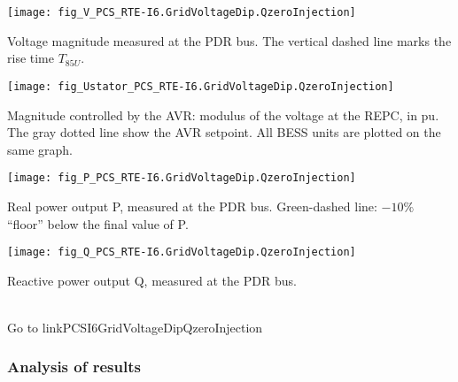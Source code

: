     \noindent
    \begin{minipage}[t]{0.48\textwidth}
        \centering
        \texttt{[image: fig\_V\_PCS\_RTE-I6.GridVoltageDip.QzeroInjection]}
        \begin{minipage}[t]{0.8\textwidth}
            \small Voltage magnitude measured at the PDR bus.
            The vertical dashed line marks the rise time $T_{85U}$.
        \end{minipage}
    \end{minipage}
    \hfill
    \begin{minipage}[t]{0.48\textwidth}
        \centering
        \texttt{[image: fig\_Ustator\_PCS\_RTE-I6.GridVoltageDip.QzeroInjection]}
        \begin{minipage}[t]{0.8\textwidth}
            \small Magnitude controlled by the AVR: modulus of the voltage at the REPC, in pu.
            The gray dotted line show the AVR setpoint. All BESS units are plotted on the same
            graph.
        \end{minipage}
    \end{minipage}

    \vspace{0.5cm}

    \noindent
    \begin{minipage}[t]{0.48\textwidth}
        \centering
        \texttt{[image: fig\_P\_PCS\_RTE-I6.GridVoltageDip.QzeroInjection]}
        \begin{minipage}[t]{0.8\textwidth}
            \small Real power output P, measured at the PDR bus. Green-dashed
            line: $-10\%$ ``floor'' below the final value of P.
        \end{minipage}
    \end{minipage}
    \hfill
    \begin{minipage}[t]{0.48\textwidth}
        \centering
        \texttt{[image: fig\_Q\_PCS\_RTE-I6.GridVoltageDip.QzeroInjection]}
        \begin{minipage}[t]{0.8\textwidth}
            \small Reactive power output Q, measured at the PDR bus.
        \end{minipage}
    \end{minipage}
    \\[2\baselineskip]
    Go to  {{ linkPCSI6GridVoltageDipQzeroInjection }}


    \subsubsection{Analysis of results}

